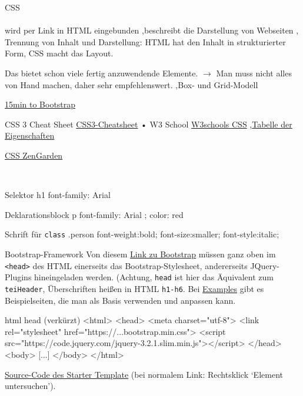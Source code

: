 \begin{frame}{CSS}
\\
\\

wird per Link in HTML eingebunden \sep beschreibt die Darstellung von Webseiten \sep
Trennung von Inhalt und Darstellung: HTML hat den Inhalt in strukturierter Form, CSS macht das Layout.

Das  bietet schon viele fertig anzuwendende Elemente. $\to$ Man muss nicht alles von Hand machen, daher sehr empfehlenswert. \sep Box- und Grid-Modell

\href{https://tutorialzine.com/2015/10/learn-the-bootstrap-grid-in-15-minutes}{15min to Bootstrap}

CSS 3 Cheat Sheet
\href{http://www.smashingmagazine.com/wp-
content/uploads/images/css3-cheat-sheet/css3-cheat-
sheet.pdf}{CSS3-Cheatsheet}
• W3 School
\href{http://www.w3schools.com/css/}{W3schools CSS} \sep \href{http://www.w3.org/TR/CSS21/propidx.html}{Tabelle der Eigenschaften}


\href{http://www.csszengarden.com}{CSS ZenGarden}

\\

\begin{mycss}{Selektor}
h1 {
font-family: Arial
}
\end{mycss}


\begin{mycss}{Deklarationsblock}
p {
font-family: Arial ;
color: red
}
\end{mycss}

\begin{mycss}{Schrift für \texttt{class}}
.person {
    font-weight:bold;
    font-size:smaller;
    font-style:italic;
}
\end{mycss}
\end{frame}

\begin{frame}{Bootstrap-Framework}
Von diesem \href{https://getbootstrap.com/docs/4.0/getting-started/introduction/}{Link zu Bootstrap} müssen ganz oben im \texttt{<head>} des HTML einerseits das Bootstrap-Stylesheet, andererseits JQuery-Plugins hineingeladen werden.
(Achtung, \texttt{head} ist hier das Äquivalent zum \texttt{teiHeader}, Überschriften heißen in HTML \texttt{h1-h6}.
Bei \href{https://getbootstrap.com/docs/4.0/examples/}{Examples} gibt es Beispielseiten, die man als Basis verwenden und anpassen kann.
\begin{myhtml}{html head (verkürzt)}
<html>
    <head>
    <meta charset="utf-8">
    <link rel="stylesheet" href="https://...bootstrap.min.css">
    <script src="https://code.jquery.com/jquery-3.2.1.slim.min.js"></script>
    </head>
    <body> [...] </body>
</html>
\end{myhtml}
\href{view-source:https://getbootstrap.com/docs/4.0/examples/starter-template/}{Source-Code des Starter Template} (bei normalem Link: Rechtsklick `Element untersuchen').
\end{frame}

